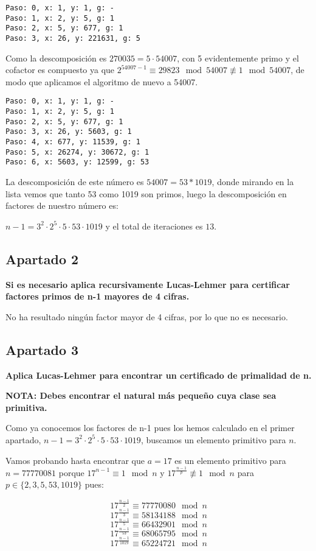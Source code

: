 \documentclass[a4paper]{article}
\begin{document}
\begin{verbatim}
Paso: 0, x: 1, y: 1, g: -
Paso: 1, x: 2, y: 5, g: 1
Paso: 2, x: 5, y: 677, g: 1
Paso: 3, x: 26, y: 221631, g: 5
\end{verbatim}

Como la descomposición es $270035=5\cdot 54007$, con 5 evidentemente primo y el cofactor es compuesto ya que $2^{54007-1}\equiv 29823\mod 54007\not\equiv 1\mod 54007$, de modo que aplicamos el algoritmo de nuevo a 54007.

\begin{verbatim}
Paso: 0, x: 1, y: 1, g: -
Paso: 1, x: 2, y: 5, g: 1
Paso: 2, x: 5, y: 677, g: 1
Paso: 3, x: 26, y: 5603, g: 1
Paso: 4, x: 677, y: 11539, g: 1
Paso: 5, x: 26274, y: 30672, g: 1
Paso: 6, x: 5603, y: 12599, g: 53
\end{verbatim}

La descomposición de este número es $54007=53*1019$, donde mirando en la lista vemos que tanto 53 como 1019 son primos, luego la descomposición en factores de nuestro número es:

$n-1=3^2\cdot 2^5\cdot 5 \cdot 53 \cdot 1019$ y el total de iteraciones es $13$.



\subsection{Apartado 2}
\textbf{Si es necesario aplica recursivamente Lucas-Lehmer para certificar factores primos de n-1 mayores de 4 cifras.}

No ha resultado ningún factor mayor de 4 cifras, por lo que no es necesario.

\subsection{Apartado 3}

\textbf{Aplica Lucas-Lehmer para encontrar un certificado de primalidad de n.}

\textbf{NOTA: Debes encontrar el natural más pequeño cuya clase sea primitiva.}

Como ya conocemos los factores de {n-1} pues los hemos calculado en el primer apartado, $n-1=3^2\cdot 2^5\cdot 5 \cdot 53 \cdot 1019$, buscamos un elemento primitivo para $n$.

Vamos probando hasta encontrar que $a=17$ es un elemento primitivo para $n=77770081$ porque $17^{n-1}\equiv 1\mod n$ y $17^{\frac{n-1}{p}}\not\equiv 1\mod n $ para $p\in\{2,3,5,53,1019\}$ pues:

$$17^{\frac{n-1}{2}}\equiv 77770080\mod n$$
$$17^{\frac{n-1}{3}}\equiv 58134188\mod n$$
$$17^{\frac{n-1}{5}}\equiv 66432901\mod n$$
$$17^{\frac{n-1}{53}}\equiv 68065795\mod n$$
$$17^{\frac{n-1}{1019}}\equiv 65224721\mod n$$
\end{document}
